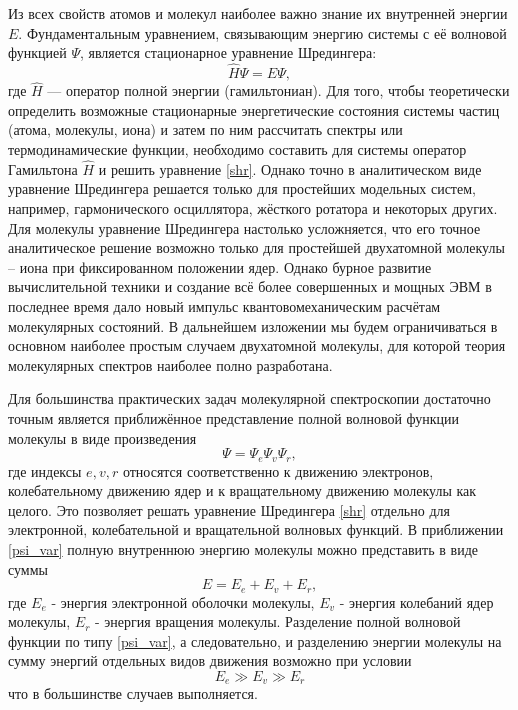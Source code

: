 Из всех свойств атомов и молекул наиболее важно знание их внутренней
энергии $E$. Фундаментальным уравнением, связывающим энергию системы с её
волновой функцией $\Psi$, является стационарное уравнение Шредингера:
\begin{equation}
\label{shr}
\hat H\Psi=E\Psi,
\end{equation}
где $\hat H$ --- оператор полной энергии (гамильтониан). Для того, чтобы
теоретически определить возможные стационарные энергетические состояния
системы частиц (атома, молекулы, иона) и затем по ним рассчитать спектры
или термодинамические функции, необходимо составить для системы оператор
Гамильтона $\hat H$ и решить уравнение \eqref{shr}. Однако точно в аналитическом виде
уравнение Шредингера решается только для простейших модельных систем,
например, гармонического осциллятора, жёсткого ротатора и некоторых
других. Для молекулы уравнение Шредингера настолько усложняется, что его
точное аналитическое решение возможно только для простейшей двухатомной
молекулы – иона при фиксированном положении ядер. Однако бурное
развитие вычислительной техники и создание всё более совершенных и
мощных ЭВМ в последнее время дало новый импульс квантовомеханическим
расчётам молекулярных состояний. В дальнейшем изложении мы будем
ограничиваться в основном наиболее простым случаем двухатомной молекулы,
для которой теория молекулярных спектров наиболее полно разработана.

Для большинства практических задач молекулярной спектроскопии достаточно
точным является приближённое представление полной волновой функции
молекулы в виде произведения
\begin{equation}
\label{psi_var}
\Psi = \Psi_e\Psi_v\Psi_r,
\end{equation}
где индексы $e, v, r$ относятся соответственно к движению электронов,
колебательному движению ядер и к вращательному движению молекулы как
целого. Это позволяет решать уравнение Шредингера \eqref{shr} отдельно для
электронной, колебательной и вращательной волновых функций. В
приближении \eqref{psi_var} полную внутреннюю энергию молекулы можно представить в виде суммы
\begin{equation}
\label{energy}E = E_e+ E_v+E_r,
\end{equation}
где $E_e$ - энергия электронной оболочки молекулы, $E_v$ - энергия колебаний ядер молекулы, $E_r$ - энергия вращения молекулы. Разделение полной волновой функции по типу \eqref{psi_var}, а следовательно, и разделению энергии молекулы на сумму энергий отдельных видов движения возможно при
условии
\begin{equation}
E_e \gg E_v \gg E_r
\end{equation}
что в большинстве случаев выполняется.